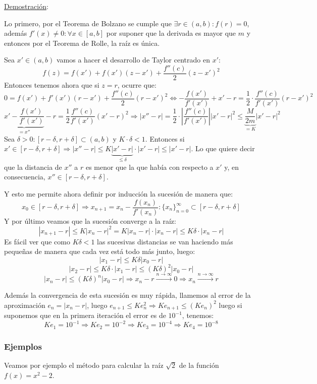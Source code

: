 \documentclass[10pt,a4paper,openright]{book}
\begin{document}
\underline{Demostración}:

Lo primero, por el Teorema de Bolzano se cumple que $\exists r\in (a,b): f(r)=0$, además $f'(x)\neq 0: \forall x\in [a,b]$ por suponer que la derivada es mayor que $m$ y entonces por el Teorema de Rolle, la raíz es única.

Sea $x'\in (a,b)$ vamos a hacer el desarrollo de Taylor centrado en $x'$:
$$f(z)=f(x')+f(x')(z-x')+\frac{f''(c)}{2}(z-x')^2$$
Entonces tenemos ahora que si $z=r$, ocurre que: 
$$0=f(x')+f'(x')(r-x')+\frac{f''(c)}{2}(r-x')^2\Leftrightarrow -\frac{f(x')}{f'(x')}+x'-r=\frac{1}{2}\cdot \frac{f''(c)}{f'(x')}(r-x')^2$$
$$\underbrace{x'-\frac{f(x')}{f'(x')}}_{=x''}-r =\frac{1}{2} \frac{f''(c)}{f'(x')}(x'-r)^2\Rightarrow |x''-r|=\frac{1}{2}\cdot \left|\frac{f''(c)}{f'(x')}\right||x'-r|^2\leq \underbrace{\frac{M}{2m}}_{=K}|x'-r|^2$$
Sea $\delta>0: [r-\delta, r+\delta]\subset (a,b)$ y $K\cdot \delta <1$. Entonces si $x'\in [r-\delta, r+\delta]\Rightarrow |x''-r|\leq K\underbrace{|x'-r|}_{\leq \delta}\cdot |x'-r|\leq |x'-r|$. Lo que quiere decir que la distancia de $x''$ a $r$ es menor que la que había con respecto a $x'$ y, en consecuencia, $x''\in [r-\delta, r+\delta]$.

Y esto me permite ahora definir por inducción la sucesión de manera que:
$$x_0\in [r-\delta, r+\delta]\Rightarrow x_{n+1}=x_n-\frac{f(x_n)}{f'(x_n)}: \{x_n\}_{n=0}^\infty \subset [r-\delta, r+\delta]$$
Y por último veamos que la sucesión converge a la raíz:
$$|x_{n+1}-r|\leq K|x_n-r|^2=K|x_n-r|\cdot |x_n-r|\leq K\delta \cdot |x_n-r|$$
Es fácil ver que como $K\delta<1$ las sucesivas distancias se van haciendo más pequeñas de manera que cada vez está todo más junto, luego:
$$|x_1-r|\leq K\delta |x_0-r|$$
$$|x_2-r|\leq K\delta\cdot |x_1-r|\leq (K\delta)^2 |x_0-r|$$
$$|x_n-r|\leq (K\delta)^n |x_0-r|\Rightarrow x_n-r\xrightarrow{n\rightarrow \infty}0\Rightarrow x_n\xrightarrow{n\rightarrow \infty} r$$

Además la convergencia de esta sucesión es muy rápida, llamemos al error de la aproximación $e_n=|x_n-r|$, luego $e_{n+1}\leq Ke_n^2\Rightarrow Ke_{n+1}\leq (Ke_n)^2$ luego si suponemos que en la primera iteración el error es de $10^{-1}$, tenemos:
$$Ke_1=10^{-1}\Rightarrow Ke_2=10^{-2}\Rightarrow Ke_3=10^{-4}\Rightarrow Ke_4=10^{-8}$$

\subsubsection*{Ejemplos}
Veamos por ejemplo el método para calcular la raíz $\sqrt{2}$ de la función $f(x)=x^2-2$.
\end{document}

